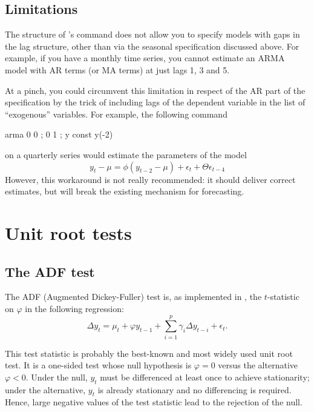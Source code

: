 \subsection{Limitations}

The structure of 's  command does not allow you
to specify models with gaps in the lag structure, other than via the
seasonal specification discussed above.  For example, if you have a
monthly time series, you cannot estimate an ARMA model with AR terms
(or MA terms) at just lags 1, 3 and 5.

At a pinch, you could circumvent this limitation in respect of the AR
part of the specification by the trick of including lags of the
dependent variable in the list of ``exogenous'' variables.  For
example, the following command
\begin{code}
  arma 0 0 ; 0 1 ; y const y(-2)
\end{code}
on a quarterly series would estimate the parameters of the model
\[
  y_t - \mu = \phi \left(y_{t-2} - \mu\right) + \epsilon_t + \Theta \epsilon_{t-4}
\]
However, this workaround is not really recommended: it should deliver
correct estimates, but will break the existing mechanism for
forecasting.

\section{Unit root tests}
\label{sec:uroot}

\subsection{The ADF test}
\label{sec:ADFtest}

The ADF (Augmented Dickey-Fuller) test is, as implemented in
, the $t$-statistic on $\varphi$ in the following regression:
\begin{equation}
  \label{eq:ADFtest}
  \Delta y_t = \mu_t + \varphi y_{t-1} + \sum_{i=1}^p \gamma_i \Delta
  y_{t-i} + \epsilon_t .
\end{equation}

This test statistic is probably the best-known and most widely used
unit root test. It is a one-sided test whose null hypothesis is
$\varphi = 0$ versus the alternative $\varphi < 0$. Under the null,
$y_t$ must be differenced at least once to achieve stationarity;
under the alternative, $y_t$ is already stationary and no differencing
is required. Hence, large negative values of the test statistic lead
to the rejection of the null.

